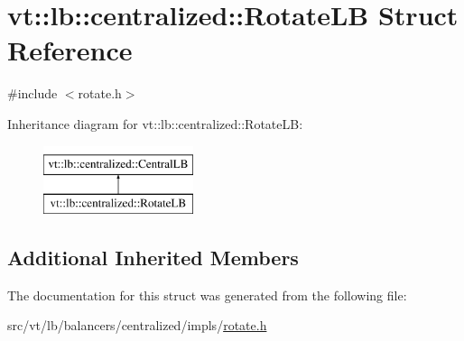 \hypertarget{structvt_1_1lb_1_1centralized_1_1_rotate_l_b}{}\section{vt\+:\+:lb\+:\+:centralized\+:\+:Rotate\+LB Struct Reference}
\label{structvt_1_1lb_1_1centralized_1_1_rotate_l_b}


{\ttfamily \#include $<$rotate.\+h$>$}

Inheritance diagram for vt\+:\+:lb\+:\+:centralized\+:\+:Rotate\+LB\+:\begin{figure}[H]
\begin{center}
\leavevmode
\includegraphics[height=2.000000cm]{structvt_1_1lb_1_1centralized_1_1_rotate_l_b}
\end{center}
\end{figure}
\subsection*{Additional Inherited Members}


The documentation for this struct was generated from the following file\+:\begin{DoxyCompactItemize}
\item 
src/vt/lb/balancers/centralized/impls/\hyperlink{rotate_8h}{rotate.\+h}\end{DoxyCompactItemize}
